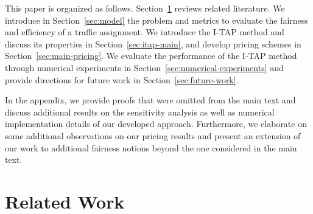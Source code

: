 \documentclass{article}
\newif\ifarxiv   %
\begin{document}
This paper is organized as follows. Section~\ref{sec:related-lit} reviews related literature. We introduce in Section~\ref{sec:model} the \fso problem and metrics to evaluate the fairness and efficiency of a \ifarxiv feasible \fi traffic assignment. We introduce the I-TAP method and discuss its properties in Section~\ref{sec:itap-main}, and develop pricing schemes \ifarxiv to enforce the computed traffic assignments as a UE \fi in Section~\ref{sec:main-pricing}. We evaluate the performance of the I-TAP method %
through numerical experiments in Section~\ref{sec:numerical-experiments} and provide directions for future work in Section~\ref{sec:future-work}. \ifarxiv Furthermore, in the appendix we also present an extension of our work to additional fairness notions beyond the one considered in the main text.

\ifarxiv
\else

In the appendix, we provide proofs that were omitted from the main text and discuss additional results on the sensitivity analysis as well as numerical implementation details of our developed approach. Furthermore, we elaborate on some additional observations on our pricing results and present an extension of our work to additional fairness notions beyond the one considered in the main text.


\fi

\section{Related Work} \label{sec:related-lit}
\end{document}
